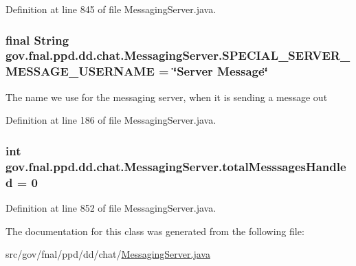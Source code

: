 Definition at line 845 of file Messaging\-Server.\-java.

\hypertarget{classgov_1_1fnal_1_1ppd_1_1dd_1_1chat_1_1MessagingServer_a738da0a18944421491268d2220a3c7a4}{
\subsubsection[{S\-P\-E\-C\-I\-A\-L\-\_\-\-S\-E\-R\-V\-E\-R\-\_\-\-M\-E\-S\-S\-A\-G\-E\-\_\-\-U\-S\-E\-R\-N\-A\-M\-E}]{\setlength{\rightskip}{0pt plus 5cm}final String gov.\-fnal.\-ppd.\-dd.\-chat.\-Messaging\-Server.\-S\-P\-E\-C\-I\-A\-L\-\_\-\-S\-E\-R\-V\-E\-R\-\_\-\-M\-E\-S\-S\-A\-G\-E\-\_\-\-U\-S\-E\-R\-N\-A\-M\-E = \char`\"{}Server Message\char`\"{}\hspace{0.3cm}{\ttfamily [static]}}}\label{classgov_1_1fnal_1_1ppd_1_1dd_1_1chat_1_1MessagingServer_a738da0a18944421491268d2220a3c7a4}
The name we use for the messaging server, when it is sending a message out 

Definition at line 186 of file Messaging\-Server.\-java.

\hypertarget{classgov_1_1fnal_1_1ppd_1_1dd_1_1chat_1_1MessagingServer_a6847562b2441991b550f7b3cb7fe8f2d}{
\subsubsection[{total\-Messsages\-Handled}]{\setlength{\rightskip}{0pt plus 5cm}int gov.\-fnal.\-ppd.\-dd.\-chat.\-Messaging\-Server.\-total\-Messsages\-Handled = 0\hspace{0.3cm}{\ttfamily [protected]}}}\label{classgov_1_1fnal_1_1ppd_1_1dd_1_1chat_1_1MessagingServer_a6847562b2441991b550f7b3cb7fe8f2d}


Definition at line 852 of file Messaging\-Server.\-java.



The documentation for this class was generated from the following file\-:\begin{DoxyCompactItemize}
\item 
src/gov/fnal/ppd/dd/chat/\hyperlink{MessagingServer_8java}{Messaging\-Server.\-java}\end{DoxyCompactItemize}
